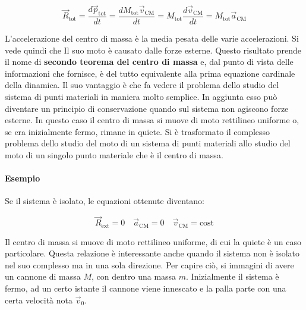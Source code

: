 \[
	\boxed{\vec{R}_\text{tot}=\frac{d\vec{p}_\text{tot}}{dt}=\frac{dM_\text{tot}\vec{v}_\text{CM}}{dt}=M_\text{tot}\frac{d\vec{v}_\text{CM}}{dt}=M_\text{tot}\vec{a}_\text{CM}}
\]

L'accelerazione del centro di massa è la media pesata delle varie accelerazioni. Si vede quindi che Il suo moto è causato dalle forze esterne.  Questo risultato prende il nome di \textbf{secondo teorema del centro di massa} e, dal punto di vista delle informazioni che fornisce, è del tutto equivalente alla prima equazione cardinale della dinamica. Il suo vantaggio è che fa vedere il problema dello studio del sistema di punti materiali in maniera molto semplice.
In aggiunta esso può diventare un principio di conservazione quando sul sistema non agiscono forze esterne. In questo caso il centro di massa si muove di moto rettilineo uniforme o, se era inizialmente fermo, rimane in quiete.
Si è trasformato il complesso problema dello studio del moto di un sistema di punti materiali allo studio del moto di un singolo punto materiale che è il centro di massa.

\paragraph{Esempio} Se il sistema è isolato, le equazioni ottenute diventano:

\[
	\vec{R}_\text{ext}=0 \quad \vec{a}_\text{CM}=0 \quad \vec{v}_\text{CM}=\text{cost}
\]

Il centro di massa si muove di moto rettilineo uniforme, di cui la quiete è un caso particolare. Questa relazione è interessante anche quando il sistema non è isolato nel suo complesso ma in una sola direzione. Per capire ciò, si immagini di avere un cannone di massa $M$, con dentro una massa $m$. Inizialmente il sistema è fermo, ad un certo istante il cannone viene innescato e la palla parte con una certa velocità nota $\vec{v}_0$.

